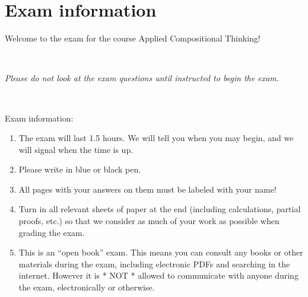 \documentclass[paper=8.125in:10.250in,pagesize=pdftex,
    headinclude=false,footinclude=false,oneside,egregdoesnotlikesansseriftitles]{kaobook}
\begin{document}
\newpage

\section*{Exam information}


Welcome to the exam for the course Applied Compositional Thinking! 

\

\emph{Please do not look at the exam questions until instructed to begin the exam.}

\

Exam information: 
\begin{enumerate}
\item The exam will last 1.5 hours. We will tell you when you may begin, and we will signal when the time is up. 
\item Please write in blue or black pen. 
\item All pages with your answers on them must be labeled with your name!
\item Turn in all relevant sheets of paper at the end (including calculations, partial proofs, etc.) so that we consider as much of your work as possible when grading the exam. 
\item This is an ``open book'' exam. This means you can consult any books or other materials during the exam, including electronic PDFs and searching in the internet. However it is * NOT * allowed to communicate with anyone during the exam, electronically or otherwise. 
\end{enumerate}

\newpage
\end{document}
